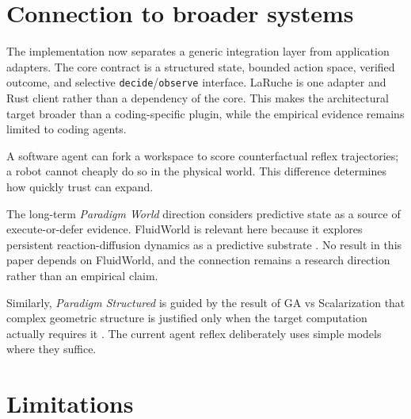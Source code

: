 \documentclass[10pt]{article}
\begin{document}
\section{Connection to broader systems}

The implementation now separates a generic integration layer from application adapters. The core contract is a structured state, bounded action space, verified outcome, and selective \texttt{decide}/\texttt{observe} interface. LaRuche is one adapter and Rust client rather than a dependency of the core. This makes the architectural target broader than a coding-specific plugin, while the empirical evidence remains limited to coding agents.

A software agent can fork a workspace to score counterfactual reflex trajectories; a robot cannot cheaply do so in the physical world. This difference determines how quickly trust can expand.

The long-term \emph{Paradigm World} direction considers predictive state as a source of execute-or-defer evidence. FluidWorld is relevant here because it explores persistent reaction-diffusion dynamics as a predictive substrate \cite{polly2026fluidworld}. No result in this paper depends on FluidWorld, and the connection remains a research direction rather than an empirical claim.

Similarly, \emph{Paradigm Structured} is guided by the result of GA vs Scalarization that complex geometric structure is justified only when the target computation actually requires it \cite{polly2026ga}. The current agent reflex deliberately uses simple models where they suffice.

\section{Limitations}
\end{document}
